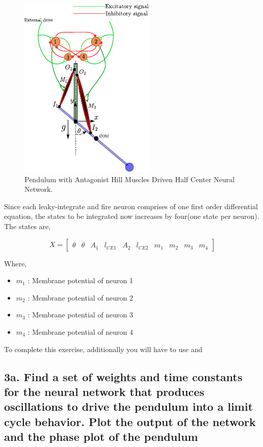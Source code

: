 \documentclass{cmc}
\begin{document}
\begin{figure}[H]
  \centering
  \includegraphics[scale=1.5]{figures/pendulum_muscles_neurons.pdf}
  \caption{Pendulum with Antagonist Hill Muscles Driven Half Center
    Neural Network.}
  \label{fig:p_muscles_neurons}
\end{figure}

Since each leaky-integrate and fire neuron comprises of one first
order differential equation, the states to be integrated now increases
by four(one state per neuron). The states are,


\begin{equation}
  \label{eq:1}
  X = \begin{bmatrix}
    \theta & \dot{\theta} & A_1 & l_{CE1} & A_2 & l_{CE2} & m_1 & m_2 & m_3 & m_4
  \end{bmatrix}
\end{equation}

Where,

\begin{itemize}
\item $m_1$ : Membrane potential of neuron 1
\item $m_2$ : Membrane potential of neuron 2
\item $m_3$ : Membrane potential of neuron 3
\item $m_4$ : Membrane potential of neuron 4
\end{itemize}

To complete this exercise, additionally you will have to use
 and 

\subsection*{3a. Find a set of weights and time constants for the
  neural network that produces oscillations to drive the pendulum into
  a limit cycle behavior. Plot the output of the network and the phase
  plot of the pendulum}
\label{sec:4a}
\end{document}

